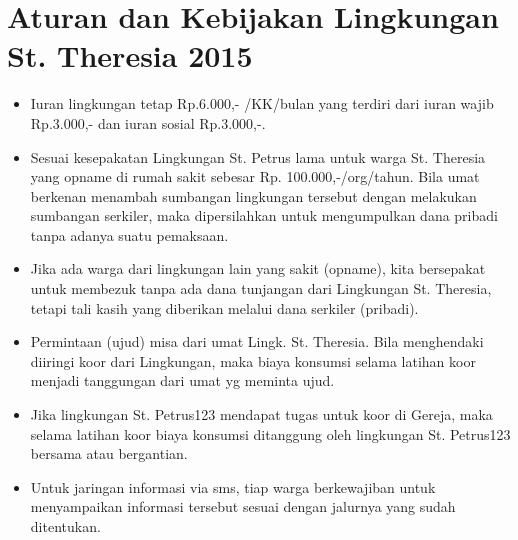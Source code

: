 \section{Aturan dan Kebijakan Lingkungan St. Theresia 2015} 

\begin{itemize}
\item Iuran lingkungan tetap Rp.6.000,- /KK/bulan yang
terdiri dari iuran wajib Rp.3.000,- dan iuran sosial Rp.3.000,-.
\item Sesuai kesepakatan 
Lingkungan St. Petrus lama untuk warga St. Theresia yang opname di rumah sakit sebesar
Rp. 100.000,-/org/tahun. Bila umat berkenan menambah sumbangan
lingkungan tersebut dengan melakukan sumbangan serkiler, maka
dipersilahkan untuk mengumpulkan dana pribadi tanpa adanya suatu
pemaksaan. 
\item Jika ada warga dari lingkungan lain yang sakit (opname), kita
bersepakat untuk membezuk tanpa ada dana tunjangan dari Lingkungan St.
Theresia, tetapi tali kasih yang diberikan melalui dana serkiler
(pribadi).
\newpage
\pagestyle{empty}
{~}
\newpage
\pagestyle{empty}
{~}
\newpage
\item Permintaan (ujud) misa dari umat Lingk. St. Theresia. Bila
menghendaki diiringi koor dari Lingkungan, maka biaya konsumsi selama
latihan koor menjadi tanggungan dari umat yg meminta ujud.
\item Jika lingkungan St. Petrus123 mendapat tugas untuk koor di Gereja,
maka selama latihan koor biaya konsumsi ditanggung oleh lingkungan St.
Petrus123 bersama atau bergantian. 
\item Untuk jaringan informasi via sms, tiap warga berkewajiban untuk
menyampaikan informasi tersebut sesuai dengan jalurnya yang sudah
ditentukan.
\end{itemize}

